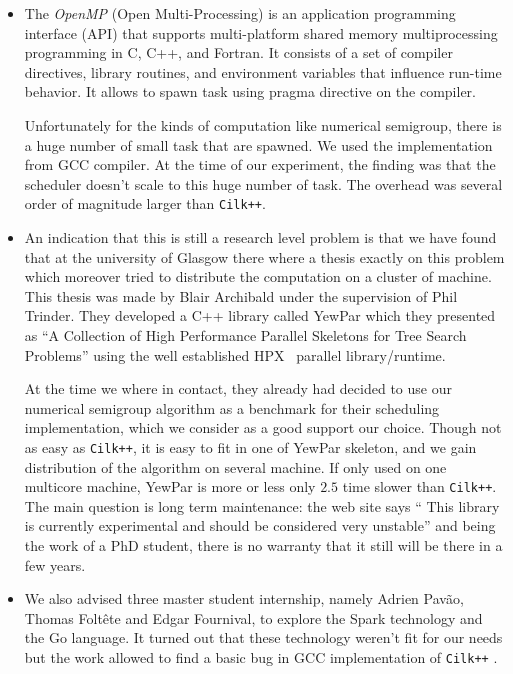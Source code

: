 \documentclass{deliverablereport}
\newcommand{\CilkP}{\texttt{Cilk++}\xspace}
\begin{document}
\begin{itemize}
\item The \emph{OpenMP} (Open Multi-Processing) is an application programming
  interface (API) that supports multi-platform shared memory multiprocessing
  programming in C, C++, and Fortran. It consists of a set of compiler
  directives, library routines, and environment variables that influence
  run-time behavior. It allows to spawn task using pragma directive on the
  compiler.

  Unfortunately for the kinds of computation like numerical semigroup, there
  is a huge number of small task that are spawned. We used the implementation
  from GCC compiler. At the time of our experiment, the finding was that the
  scheduler doesn't scale to this huge number of task. The overhead was
  several order of magnitude larger than \CilkP.

\item An indication that this is still a research level problem is that we
  have found that at the university of Glasgow there where a thesis exactly on
  this problem which moreover tried to distribute the computation on a cluster
  of machine. This thesis was made by Blair Archibald under the supervision of
  Phil Trinder. They developed a C++ library called YewPar
  \cite{YewPar} which they presented as ``A
  Collection of High Performance Parallel Skeletons for Tree Search Problems''
  using the well established HPX~\cite{HPX} parallel library/runtime.

  At the time we where in contact, they already had decided to use our
  numerical semigroup algorithm as a benchmark for their scheduling
  implementation, which we consider as a good support our choice. Though not
  as easy as \CilkP, it is easy to fit in one of YewPar skeleton, and we gain
  distribution of the algorithm on several machine. If only used on one
  multicore machine, YewPar is more or less only $2.5$ time slower than
  \CilkP. The main question is long term maintenance: the web site says ``
  This library is currently experimental and should be considered very
  unstable'' and being the work of a PhD student, there is no warranty that it
  still will be there in a few years.

\item We also advised three master student internship, namely Adrien Pavão,
  Thomas Foltête and Edgar Fournival, to explore the Spark technology and the
  Go language. It turned out that these technology weren't fit for our needs
  but the work allowed to find a basic bug in GCC implementation of \CilkP
  \cite{gcc-bug-80038}.
\end{itemize}
\end{document}
